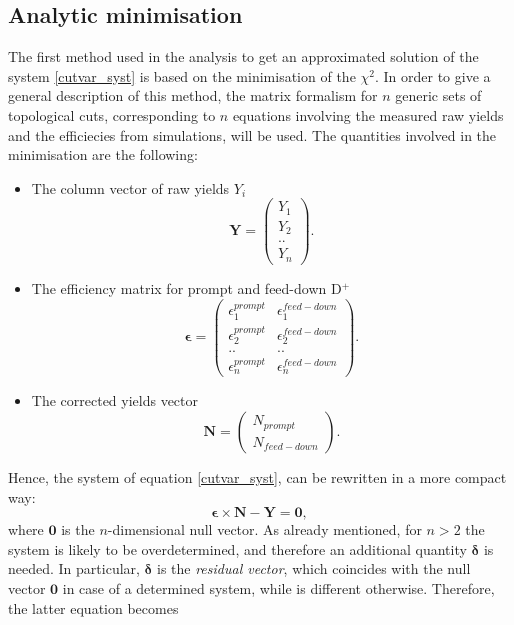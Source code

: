 \documentclass[b5paper,10pt,twoside,oldstyle,classica]{toptesi}
\begin{document}
\subsection{Analytic minimisation}
\label{analytic_min_sec}
The first method used in the analysis to get an approximated solution of the system \ref{cutvar_syst} is based on the minimisation of the $\chi^2$. In order to give a general description of this method, the matrix formalism for $n$ generic sets of topological cuts, corresponding to $n$ equations involving the measured raw yields and the efficiecies from simulations, will be used. The quantities involved in the minimisation are the following: 
\begin{itemize}
 \item The column vector of raw yields $Y_i$
\begin{equation}
\pmb{Y} = 
 \left(
\begin{array}{c}
Y_1\\
Y_2\\
..\\
Y_n
\end{array}
 \right)
 .
\end{equation} 
\item The efficiency matrix for prompt and feed-down D$^+$
\begin{equation}
\renewcommand\arraystretch{1.3} 
\pmb{\epsilon} = 
 \left(
\begin{array}{cc}
\epsilon^{prompt}_1 & \epsilon^{feed-down}_1\\
\epsilon^{prompt}_2 & \epsilon^{feed-down}_2\\
.. & ..\\
\epsilon^{prompt}_n & \epsilon^{feed-down}_n
\end{array}
 \right)
 .
\end{equation}
\item The corrected yields vector
\begin{equation}
\pmb{N} = 
 \left(
\begin{array}{c}
 N_{prompt}\\
 N_{feed-down}
\end{array}
 \right) 
 .
\end{equation} 
\end{itemize}
Hence, the system of equation \ref{cutvar_syst}, can be rewritten in a more compact way:
\begin{equation}
 \pmb{\epsilon}\times\pmb{N} - \pmb{Y} = \pmb{0},
\end{equation}
where $\pmb{0}$ is the $n$-dimensional null vector. As already mentioned, for $n>2$ the system is likely to be overdetermined, and therefore an additional quantity $\pmb{\delta}$ is needed. In particular, $\pmb{\delta}$ is the \textit{residual vector}, which coincides with the null vector $\pmb{0}$ in case of a determined system, while is different otherwise. Therefore, the latter equation becomes
\end{document}
